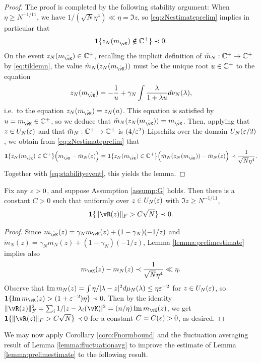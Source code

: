 \begin{proof}
The proof is completed by the following stability argument: When
$\eta \geq N^{-1/11}$, we have $1/(\sqrt{N} \eta^4) \ll \eta=\Im z$,
so \eqref{eq:zNestimateprelim} implies in particular that
\begin{equation}\label{eq:stabilityevent}
\bI\{z_N(m_{\tilde \vK}) \notin \C^+\} \prec 0.
\end{equation}
On the event $z_N(m_{\tilde \vK}) \in \C^+$, recalling the implicit definition
of $\tilde m_N:\mathbb{C}^+ \to \mathbb{C}^+$ by \eqref{eq:tildemn}, 
the value $\tilde m_N(z_N(m_{\tilde \vK}))$ must be the unique root
$u \in \mathbb{C}^+$ to the equation
\[z_N(m_{\tilde \vK})=-\frac{1}{u}+\gamma_N \int \frac{\lambda}{1+\lambda
u}d\nu_N(\lambda),\]
i.e.\ to the equation $z_N(m_{\tilde \vK})=z_N(u)$. This equation is
satisfied by $u=m_{\tilde \vK} \in \C^+$, so we deduce that
$\tilde m_N(z_N(m_{\tilde \vK}))=m_{\tilde \vK}$.
Then, applying that $z \in U_N(\varepsilon)$ and that $\tilde m_N:\mathbb{C}^+ \to \mathbb{C}^+$
is $(4/\varepsilon^2)$-Lipschitz over the domain $U_N(\varepsilon/2)$,
we obtain from \eqref{eq:zNestimateprelim} that
\[\bI\{z_N(m_{\tilde \vK}) \in \C^+\}\Big(m_{\tilde \vK}-\tilde m_N(z)\Big)
=\bI\{z_N(m_{\tilde \vK}) \in \C^+\}\Big(\tilde m_N(z_N(m_{\tilde \vK}))-\tilde
m_N(z)\Big) \prec \frac{1}{\sqrt{N} \eta^4}.\]
Together with \eqref{eq:stabilityevent}, this yields the lemma.
\end{proof}

\begin{coro}\label{coro:Fnormbound}
Fix any $\varepsilon>0$, and suppose Assumption \ref{assump:G} holds.
Then there is a constant $C>0$ such that uniformly over $z \in U_N(\varepsilon)$
with $\Im z \geq N^{-1/11}$,
\[\bI\{\|\vR(z)\|_F>C\sqrt{N}\} \prec 0.\]
\end{coro}
\begin{proof}
Since $m_{\tilde \vK}(z)=\gamma_N m_{\vK}(z)+(1-\gamma_N)(-1/z)$ and
$\tilde m_N(z)=\gamma_N m_N(z)+(1-\gamma_N)(-1/z)$, Lemma
\ref{lemma:prelimestimate} implies also
\[m_{\vK}(z)-m_N(z) \prec \frac{1}{\sqrt{N}\eta^4} \ll \eta.\]
Observe that
$\operatorname{Im} m_N(z)=\int \eta/|\lambda-z|^2 d\mu_N(\lambda) \leq \eta \varepsilon^{-2}$
for $z \in U_N(\varepsilon)$, so
$\bI\{\Im m_{\vK}(z)>(1+\eps^{-2})\eta\} \prec 0$.
Then by the identity $\|\vR(z)\|_F^2=
\sum_i 1/|z-\lambda_i(\vK)|^2=(n/\eta)\Im m_{\vK}(z)$, we get
$\bI\{\|\vR(z)\|_F>C\sqrt{N}\} \prec 0$ for a constant $C=C(\varepsilon)>0$, as desired.
\end{proof}

We may now apply Corollary \ref{coro:Fnormbound} and the fluctuation averaging
result of Lemma \ref{lemma:fluctuationavg} 
to improve the estimate of Lemma \ref{lemma:prelimestimate} to the following
result.

